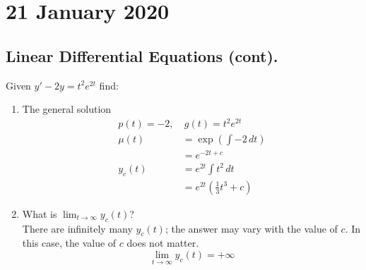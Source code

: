 \documentclass[diffeq.tex]{subfiles}
\begin{document}
\chapter{21 January 2020}
    \section{Linear Differential Equations (cont).}
    \begin{example}
        Given $y'-2y=t^{2}e^{2t}$ find:
        \begin{enumerate}
            \item The general solution
            \begin{align}
                p(t) = -2,&\ g(t) = t^{2}e^{2t}\\
                \mu(t) %
                &= \exp\left(\int -2\,dt\right)\\
                &= e^{-2t + c}\\
                y_{c}(t) &= e^{2t}\int t^{2}\,dt\\
                &= e^{2t}\left(\frac{1}{3}t^{3} + c\right)
            \end{align}
            \item What is $\lim_{t \rightarrow \infty} y_{c}(t)$?\\
            There are infinitely many $y_{c}(t)$; the answer may vary with the value of $c$. In this case, the value of $c$ does not matter.
            $$\lim_{t \rightarrow \infty} y_{c}(t) = +\infty$$
        \end{enumerate}
    \end{example}
    \np
\end{document}
